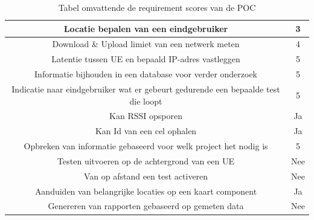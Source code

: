 \begin{table}[!htb]
    \begin{tabular}{| c | c |}
        \hline
        Locatie bepalen van een eindgebruiker & 3 \\
        \hline
        Download \& Upload limiet van een netwerk meten & 4 \\
        \hline
        Latentie tussen UE en bepaald IP-adres vastleggen & 5 \\
        \hline
        Informatie bijhouden in een database voor verder onderzoek & 5 \\
        \hline
        Indicatie naar eindgebruiker wat er gebeurt gedurende een bepaalde test die loopt & 5 \\
        \hline
        Kan RSSI opsporen & Ja \\
        \hline
        Kan Id van een cel ophalen & Ja \\
        \hline
        Opbreken van informatie gebaseerd voor welk project het nodig is & 5 \\
        \hline
        Testen uitvoeren op de achtergrond van een UE & Nee \\
        \hline
        Van op afstand een test activeren & Nee \\
        \hline
        Aanduiden van belangrijke locaties op een kaart component & Ja \\
        \hline
        Genereren van rapporten gebaseerd op gemeten data & Nee \\
        \hline
    \end{tabular}
    \caption{Tabel omvattende de requirement scores van de POC}
    \label{fig:POCTabel}
\end{table}  
